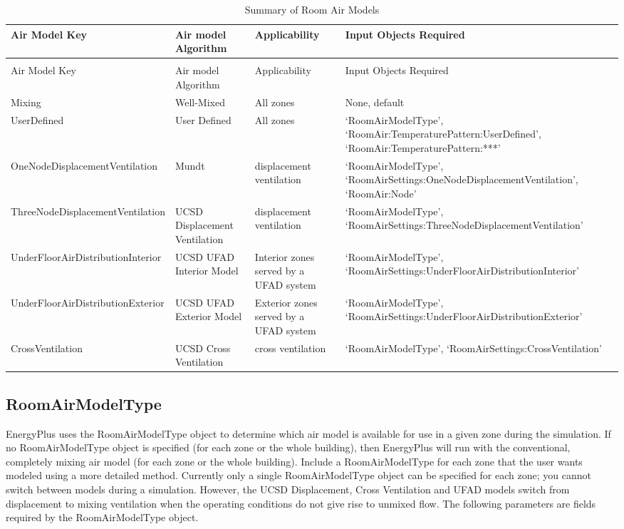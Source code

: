 {\scriptsize
\begin{longtable}[c]{p{1.5in}p{1.5in}p{1.5in}p{1.5in}}
\caption{Summary of Room Air Models \label{table:summary-of-room-air-models}} \tabularnewline
\toprule
Air Model Key & Air model Algorithm & Applicability & Input Objects Required \tabularnewline
\midrule
\endfirsthead

\caption[]{Summary of Room Air Models} \tabularnewline
\toprule
Air Model Key & Air model Algorithm & Applicability & Input Objects Required \tabularnewline
\midrule
\endhead

Mixing & Well-Mixed & All zones & None, default \tabularnewline
UserDefined & User Defined & All zones & `Room\-Air\-Model\-Type', `Room\-Air:\-Temperature\-Pattern:\-User\-Defined', `Room\-Air:\-Temperature\-Pattern:***' \tabularnewline
One\-Node\-Displacement\-Ventilation & Mundt & displacement ventilation & `Room\-Air\-Model\-Type', `Room\-Air\-Settings:\-One\-Node\-Displacement\-Ventilation', `Room\-Air:Node' \tabularnewline
Three\-Node\-Displacement\-Ventilation & UCSD Displacement Ventilation & displacement ventilation & `Room\-Air\-Model\-Type', `Room\-Air\-Settings:\-Three\-Node\-Displacement\-Ventilation' \tabularnewline
Under\-Floor\-Air\-Distribution\-Interior & UCSD UFAD Interior Model & Interior zones served by a UFAD system & `Room\-Air\-Model\-Type', `Room\-Air\-Settings:\-Under\-Floor\-Air\-Distribution\-Interior' \tabularnewline
Under\-Floor\-Air\-Distribution\-Exterior & UCSD UFAD Exterior Model & Exterior zones served by a UFAD system & `Room\-Air\-Model\-Type', `Room\-Air\-Settings:\-Under\-Floor\-Air\-Distribution\-Exterior' \tabularnewline
Cross\-Ventilation & UCSD Cross Ventilation & cross ventilation & `Room\-Air\-Model\-Type', `Room\-Air\-Settings:\-Cross\-Ventilation' \tabularnewline
\bottomrule
\end{longtable}
}

\subsection{RoomAirModelType}\label{roomairmodeltype}

EnergyPlus uses the Room\-Air\-Model\-Type object to determine which air model is available for use in a given zone during the simulation. If no Room\-Air\-Model\-Type object is specified (for each zone or the whole building), then EnergyPlus will run with the conventional, completely mixing air model (for each zone or the whole building). Include a Room\-Air\-Model\-Type for each zone that the user wants modeled using a more detailed method. Currently only a single Room\-Air\-Model\-Type object can be specified for each zone; you cannot switch between models during a simulation. However, the UCSD Displacement, Cross Ventilation and UFAD models switch from displacement to mixing ventilation when the operating conditions do not give rise to unmixed flow. The following parameters are fields required by the Room\-Air\-Model\-Type object.

